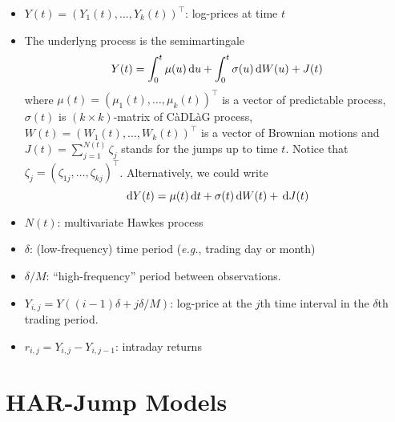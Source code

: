 \documentclass[11pt]{article}
\newcommand \dd[1]{\,\textrm d{#1}}
\begin{document}
\begin{itemize}
\item \(Y(t)=(Y_1(t),\dots,Y_k(t))^\top\): log-prices at time \(t\)
\item The underlyng process is the semimartingale
\begin{equation*}
Y(t)=\int_0^t\mu(u)\dd u+\int_0^t\sigma(u)\dd W(u)+J(t)
\end{equation*}
where \(\mu(t)=(\mu_1(t),\dots,\mu_k(t))^\top\) is a vector of predictable process, \(\sigma(t)\) is \((k\times k)\)-matrix of CàDLàG process, \(W(t)=(W_1(t),\dots,W_k(t))^\top\) is a vector of Brownian motions and \(J(t)=\sum_{j=1}^{N(t)}\zeta_j\) stands for the jumps up to time \(t\). Notice that \(\zeta_j=(\zeta_{1j},\dots,\zeta_{kj})^\top\). Alternatively, we could write
\begin{equation*}
\dd Y(t)=\mu(t)\dd t+\sigma(t)\dd W(t)+\dd J(t)
\end{equation*}
\item \(N(t)\): multivariate Hawkes process
\item \(\delta\): (low-frequency) time period (\textit{e.g.}, trading day or month)
\item \(\delta/M\): ``high-frequency'' period between observations.
\item \(Y_{i,j}=Y((i-1)\delta+j\delta/M)\): log-price at the \(j\)th time interval in the \(\delta\)th trading period.
\item \(r_{i,j}=Y_{i,j}-Y_{i,j-1}\): intraday returns
\end{itemize}

\section{HAR-Jump Models}
\end{document}
